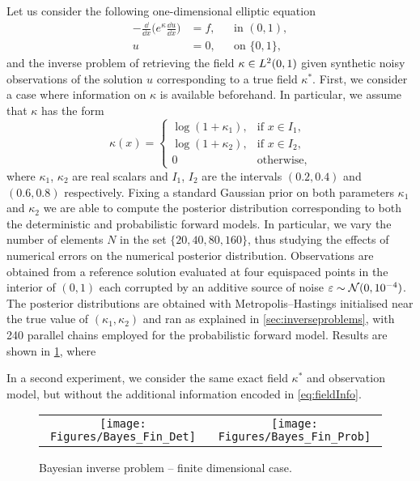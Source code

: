 \documentclass[10pt]{article}
\begin{document}
Let us consider the following one-dimensional elliptic equation
\begin{equation}
\begin{aligned}
	-\frac{\dd}{\dd x}\big(e^{\kappa} \frac{\dd u}{\dd x}\big) &= f, &&\text{in } (0,1),\\
	u &= 0, &&\text{on } \{0, 1\},
\end{aligned}
\end{equation}
and the inverse problem of retrieving the field $\kappa \in L^2(0, 1)$ given synthetic noisy observations of the solution $u$ corresponding to a true field $\kappa^*$. First, we consider a case where information on $\kappa$ is available beforehand. In particular, we assume that $\kappa$ has the form
\begin{equation}\label{eq:fieldInfo}
	\kappa(x) = \begin{cases}	
				\log(1 + \kappa_1), & \mbox{if } x \in I_1, \\
				\log(1 + \kappa_2), & \mbox{if } x \in I_2, \\	
				0 & \mbox{otherwise},
				\end{cases}
\end{equation}
where $\kappa_1$, $\kappa_2$ are real scalars and $I_1$, $I_2$ are the intervals $(0.2, 0.4)$ and $(0.6, 0.8)$ respectively. Fixing a standard Gaussian prior on both parameters $\kappa_1$ and $\kappa_2$ we are able to compute the posterior distribution corresponding to both the deterministic and probabilistic forward models. In particular, we vary the number of elements $N$ in the set $\{20, 40, 80, 160\}$, thus studying the effects of numerical errors on the numerical posterior distribution. Observations are obtained from a reference solution evaluated at four equispaced points in the interior of $(0, 1)$ each corrupted by an additive source of noise $\varepsilon \sim \mathcal N(0, 10^{-4})$. The posterior distributions are obtained with Metropolis--Hastings initialised near the true value of $(\kappa_1, \kappa_2)$ and ran as explained in \cref{sec:inverseproblems}, with 240 parallel chains employed for the probabilistic forward model. Results are shown in \cref{fig:BayesFin}, where \todo

In a second experiment, we consider the same exact field $\kappa^*$ and observation model, but without the additional information encoded in \eqref{eq:fieldInfo}.

\begin{figure}[t]
	\centering
	\begin{tabular}{cc}
		\texttt{[image: Figures/Bayes\_Fin\_Det]} & \texttt{[image: Figures/Bayes\_Fin\_Prob]} \\
	\end{tabular}
	\caption{Bayesian inverse problem -- finite dimensional case.}
	\label{fig:BayesFin}
\end{figure}
\end{document}
